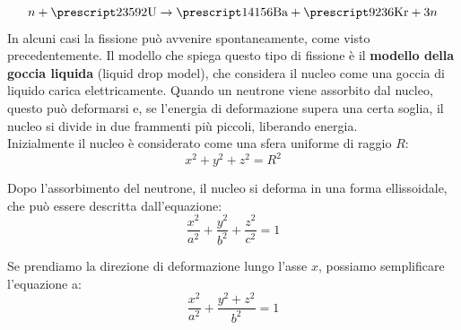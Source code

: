 \begin{equation}
    n + \atom{U}{235}{92} \rightarrow \atom{Ba}{141}{56} + \atom{Kr}{92}{36} + 3n
\end{equation}
In alcuni casi la fissione può avvenire spontaneamente, come visto precedentemente. Il modello che spiega questo tipo di fissione è il \textbf{modello della goccia liquida} (liquid drop model), che considera il nucleo come una goccia di liquido carica elettricamente. Quando un neutrone viene assorbito dal nucleo, questo può deformarsi e, se l'energia di deformazione supera una certa soglia, il nucleo si divide in due frammenti più piccoli, liberando energia.\\
Inizialmente il nucleo è considerato come una sfera uniforme di raggio $R$:
\begin{equation}
    x^2 + y^2 + z^2 = R^2
\end{equation}


Dopo l'assorbimento del neutrone, il nucleo si deforma in una forma ellissoidale, che può essere descritta dall'equazione:
\begin{equation}
    \dfrac{x^2}{a^2} + \dfrac{y^2}{b^2} + \dfrac{z^2}{c^2} = 1
\end{equation}

Se prendiamo la direzione di deformazione lungo l'asse $x$, possiamo semplificare l'equazione a:
\begin{equation}
    \dfrac{x^2}{a^2} + \dfrac{y^2 + z^2}{b^2} = 1
\end{equation}


